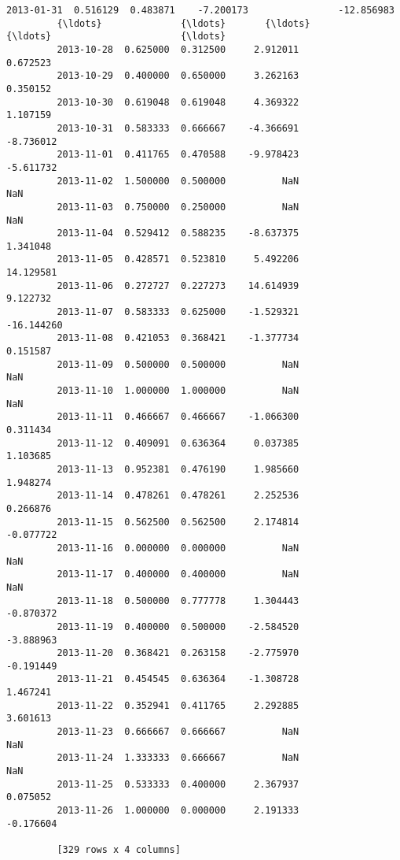 \documentclass[11pt]{article}
\begin{document}
\begin{Verbatim}[commandchars=\\\{\}]
         2013-01-31  0.516129  0.483871    -7.200173                -12.856983
         {\ldots}              {\ldots}       {\ldots}          {\ldots}                       {\ldots}
         2013-10-28  0.625000  0.312500     2.912011                  0.672523
         2013-10-29  0.400000  0.650000     3.262163                  0.350152
         2013-10-30  0.619048  0.619048     4.369322                  1.107159
         2013-10-31  0.583333  0.666667    -4.366691                 -8.736012
         2013-11-01  0.411765  0.470588    -9.978423                 -5.611732
         2013-11-02  1.500000  0.500000          NaN                       NaN
         2013-11-03  0.750000  0.250000          NaN                       NaN
         2013-11-04  0.529412  0.588235    -8.637375                  1.341048
         2013-11-05  0.428571  0.523810     5.492206                 14.129581
         2013-11-06  0.272727  0.227273    14.614939                  9.122732
         2013-11-07  0.583333  0.625000    -1.529321                -16.144260
         2013-11-08  0.421053  0.368421    -1.377734                  0.151587
         2013-11-09  0.500000  0.500000          NaN                       NaN
         2013-11-10  1.000000  1.000000          NaN                       NaN
         2013-11-11  0.466667  0.466667    -1.066300                  0.311434
         2013-11-12  0.409091  0.636364     0.037385                  1.103685
         2013-11-13  0.952381  0.476190     1.985660                  1.948274
         2013-11-14  0.478261  0.478261     2.252536                  0.266876
         2013-11-15  0.562500  0.562500     2.174814                 -0.077722
         2013-11-16  0.000000  0.000000          NaN                       NaN
         2013-11-17  0.400000  0.400000          NaN                       NaN
         2013-11-18  0.500000  0.777778     1.304443                 -0.870372
         2013-11-19  0.400000  0.500000    -2.584520                 -3.888963
         2013-11-20  0.368421  0.263158    -2.775970                 -0.191449
         2013-11-21  0.454545  0.636364    -1.308728                  1.467241
         2013-11-22  0.352941  0.411765     2.292885                  3.601613
         2013-11-23  0.666667  0.666667          NaN                       NaN
         2013-11-24  1.333333  0.666667          NaN                       NaN
         2013-11-25  0.533333  0.400000     2.367937                  0.075052
         2013-11-26  1.000000  0.000000     2.191333                 -0.176604
         
         [329 rows x 4 columns]
\end{Verbatim}
            
\end{document}
